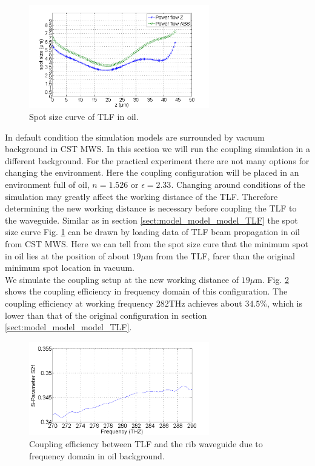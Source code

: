 \begin{figure}[!ht]
\centering
\includegraphics[width=0.7\textwidth]{bilder/spot_curve_oil}
\caption{Spot size curve of TLF in oil.}
\label{fig:oil_spot_curve}
\end{figure}
In default condition the simulation models are surrounded by vacuum background in CST MWS.
In this section we will run the coupling simulation in a different background. For the practical experiment there are not many options for changing the environment. Here the coupling configuration will be placed in an environment full of oil, $n=1.526$ or $\epsilon=2.33$. Changing around conditions of the simulation may greatly affect the working distance of the TLF. Therefore determining the new working distance is necessary before coupling the TLF to the waveguide.  Similar as in section \ref{sect:model_model_model_TLF} the spot size curve Fig. \ref{fig:oil_spot_curve} can be drawn by loading data of TLF beam propagation in oil from CST MWS. Here we can tell from the spot size cure that the minimum spot in oil lies at the position of about $19\mu$m from the TLF, farer than the original minimum spot location in vacuum.\\    

We simulate the coupling setup at the new working distance of $19\mu$m. Fig. \ref{fig:oil_coupling_curve} shows the coupling efficiency in frequency domain of this configuration. The coupling efficiency at working frequency $282$THz achieves about $34.5\%$, which is lower than that of the original configuration in section \ref{sect:model_model_model_TLF}.\\

\begin{figure}[!ht]
\centering
\includegraphics[width=0.7\textwidth]{bilder/s21_oil_curve}
\caption{Coupling efficiency between TLF and the rib waveguide due to frequency domain in oil background.}
\label{fig:oil_coupling_curve}
\end{figure}